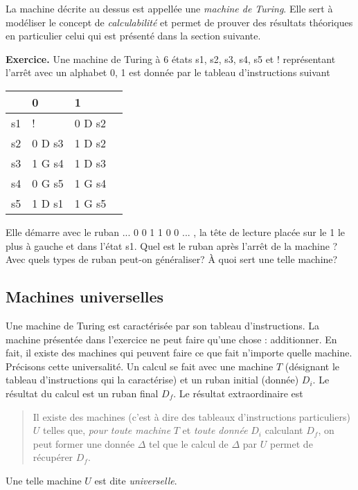 La machine décrite au dessus est appellée une \emph{machine de Turing}. Elle sert à modéliser le concept de \emph{calculabilité} et permet de prouver des résultats théoriques en particulier celui qui est présenté dans la section suivante.

\textbf{Exercice.}\newline
Une machine de Turing à 6 états s1, s2, s3, s4, s5 et ! représentant l'arrêt avec un alphabet 0, 1 est donnée par le tableau d'instructions suivant
\begin{center}
\renewcommand{\arraystretch}{1.5}
\begin{tabular}{|l|l|l|l|} \hline
   & 0  & 1     \\ \hline
s1 & !      & 0 D s2  \\ \hline
s2 & 0 D s3 & 1 D s2  \\ \hline
s3 & 1 G s4 & 1 D s3  \\ \hline
s4 & 0 G s5 & 1 G s4  \\ \hline
s5 & 1 D s1 & 1 G s5  \\ \hline
\end{tabular}
\end{center}
Elle démarre avec le ruban ... 0 0 1 1 0 0 ... , la tête de lecture placée sur le 1 le plus à gauche et dans l'état s1. Quel est le ruban après l'arrêt de la machine ? Avec quels types de ruban peut-on généraliser? \`A quoi sert une telle machine?

\subsection{Machines universelles}
Une machine de Turing est caractérisée par son tableau d'instructions. La machine présentée dans l'exercice ne peut faire qu'une chose : additionner.\newline
En fait, il existe des machines qui peuvent faire ce que fait n'importe quelle machine. Précisons cette universalité.\newline
Un calcul se fait avec une machine $T$ (désignant le tableau d'instructions qui la caractérise) et un ruban initial (donnée) $D_i$. Le résultat du calcul est un ruban final $D_f$. Le résultat extraordinaire est 
\begin{quotation}
  Il existe des machines (c'est à dire des tableaux d'instructions particuliers) $U$ telles que, \emph{pour toute machine} $T$ et \emph{toute donnée} $D_i$ calculant $D_f$, on peut former une donnée $\Delta$ tel que le calcul de $\Delta$ par $U$ permet de récupérer $D_f$.
\end{quotation} 
Une telle machine $U$ est dite \emph{universelle}.

